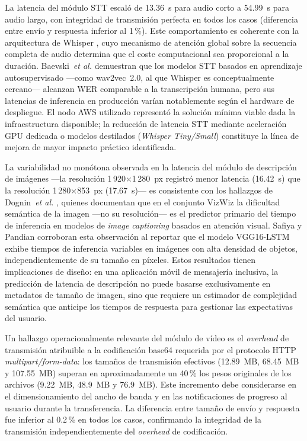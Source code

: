 \documentclass[journal]{IEEEtran}
\begin{document}
	La latencia del m\'odulo STT escal\'o de 13.36~s para audio corto a 54.99~s para audio largo, con integridad de transmisi\'on perfecta en todos los casos (diferencia entre env\'io y respuesta inferior al 1\,\%). Este comportamiento es coherente con la arquitectura de Whisper \cite{radford2023}, cuyo mecanismo de atenci\'on global sobre la secuencia completa de audio determina que el coste computacional sea proporcional a la duraci\'on. Baevski~\textit{et al.} \cite{baevski2020} demuestran que los modelos STT basados en aprendizaje autosupervisado ---como wav2vec~2.0, al que Whisper es conceptualmente cercano--- alcanzan WER comparable a la transcripci\'on humana, pero sus latencias de inferencia en producci\'on var\'ian notablemente seg\'un el hardware de despliegue. El nodo AWS utilizado represent\'o la soluci\'on m\'inima viable dada la infraestructura disponible; la reducci\'on de latencia STT mediante aceleraci\'on GPU dedicada o modelos destilados (\textit{Whisper Tiny/Small}) constituye la l\'inea de mejora de mayor impacto pr\'actico identificada.
	
	La variabilidad no mon\'otona observada en la latencia del m\'odulo de descripci\'on de im\'agenes ---la resoluci\'on 1\,920$\times$1\,280~px registr\'o menor latencia (16.42~s) que la resoluci\'on 1\,280$\times$853~px (17.67~s)--- es consistente con los hallazgos de Dognin~\textit{et al.} \cite{dognin2021}, quienes documentan que en el conjunto VizWiz la dificultad sem\'antica de la imagen ---no su resoluci\'on--- es el predictor primario del tiempo de inferencia en modelos de \textit{image captioning} basados en atenci\'on visual. Safiya y Pandian \cite{safiya2024} corroboran esta observaci\'on al reportar que el modelo VGG16-LSTM exhibe tiempos de inferencia variables en im\'agenes con alta densidad de objetos, independientemente de su tama\~no en p\'ixeles. Estos resultados tienen implicaciones de dise\~no: en una aplicaci\'on m\'ovil de mensajer\'ia inclusiva, la predicci\'on de latencia de descripci\'on no puede basarse exclusivamente en metadatos de tama\~no de imagen, sino que requiere un estimador de complejidad sem\'antica que anticipe los tiempos de respuesta para gestionar las expectativas del usuario.
	
	Un hallazgo operacionalmente relevante del m\'odulo de v\'ideo es el \textit{overhead} de transmisi\'on atribuible a la codificaci\'on base64 requerida por el protocolo HTTP \textit{multipart/form-data}: los tama\~nos de transmisi\'on efectivos (12.89~MB, 68.45~MB y 107.55~MB) superan en aproximadamente un 40\,\% los pesos originales de los archivos (9.22~MB, 48.9~MB y 76.9~MB). Este incremento debe considerarse en el dimensionamiento del ancho de banda y en las notificaciones de progreso al usuario durante la transferencia. La diferencia entre tama\~no de env\'io y respuesta fue inferior al 0.2\,\% en todos los casos, confirmando la integridad de la transmisi\'on independientemente del \textit{overhead} de codificaci\'on.
	
\end{document}
